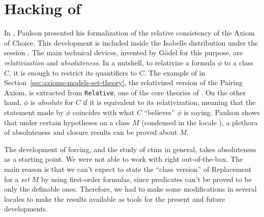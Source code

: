 \section{Hacking of }
\label{sec:hack-constructible}
In \cite{paulson_2003}, Paulson presented his formalization of the
relative consistency of the Axiom of Choice. This development is
included inside the Isabelle distribution under the session 
. The main technical devices, invented by
G\"odel for this purpose, are \emph{relativization} and
\emph{absoluteness}. In a nutshell, to relativize a formula $\phi$ to
a class $C$, it is enough to restrict its quantifiers to $C$. The
example of  in
Section~\ref{sec:axioms-models-set-theory}, the relativized version of
the Pairing Axiom, is extracted from \texttt{Relative}, one of the
core theories of . On the other hand, $\phi$
is \emph{absolute} for $C$ if it is equivalent to its relativization,
meaning that the statement made by $\phi$ coincides with what $C$
``believes'' $\phi$ is saying. Paulson shows that under certain
hypotheses  on a class $M$ (condensed in the locale ), a plethora of
absoluteness and closure results can be proved about $M$.

The development of forcing, and the study of ctms in general, takes
absoluteness as a starting point. We were not able to work with
 right out-of-the-box. The main reason is that
we can't expect to state the ``class version'' of Replacement for a
\emph{set} $M$ by
using first-order formulas, since predicates
 can't
be proved to be only the definable ones. Therefore, we had to make
some modifications in several
locales to make the results available as tools for the present and
future developments.


